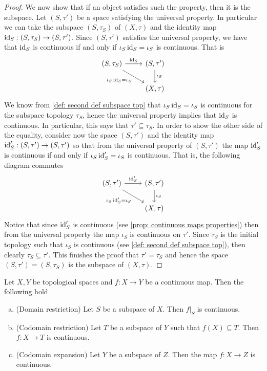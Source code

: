 \begin{proof}
    We now show that if an object satisfies such the property, then it is the
    subspace. Let \((S, \tau')\) be a space satisfying the universal
    property. In particular we can take the subspace \((S, \tau_S)\) of
    \((X, \tau)\) and the identity map \(\operatorname{id}_S: (S, \tau_S) \to (S,
    \tau')\). Since \((S, \tau')\) satisfies the universal property,
    we have that \(\operatorname{id}_S\) is continuous if and only if \(\iota_S  \operatorname{id}_S =
    \iota_S\) is continuous. That is
    \[
        \begin{tikzcd}
            (S, \tau_S)
            \ar[r, "\Id_S"]
            \ar[rd, swap, "\iota_S  \Id_S = \iota_S"]
            &(S, \tau') \ar[d, "\iota_S"] \\
            &(X, \tau)
        \end{tikzcd}
    \]
    We know from \cref{def: second def subspace top} that \(\iota_S  \operatorname{id}_S =
    \iota_S\) is continuous for the subspace topology \(\tau_S\), hence the
    universal property implies that \(\operatorname{id}_S\) is continuous. In particular, this
    says that \(\tau' \subseteq \tau_S\). In order to show the other
    side of the equality, consider now the space \((S, \tau')\) and the
    identity map \(\operatorname{id}_S': (S, \tau') \to (S, \tau')\) so that from the
    universal property of \((S, \tau')\) the map \(\operatorname{id}_S'\) is continuous if
    and only if \(\iota_S  \operatorname{id}_S' = \iota_S\) is continuous. That is, the
    following diagram commutes
    \[
        \begin{tikzcd}
            (S, \tau') \ar[r, "\Id_S'"]
            \ar[rd, swap, "\iota_S  \Id_S' = \iota_S"]
            &(S, \tau') \ar[d, "\iota_S"] \\
            &(X, \tau)
        \end{tikzcd}
    \]
    Notice that since \(\operatorname{id}_S'\) is continuous (see \cref{prop: continuous maps
        properties}) then from the universal property the map \(\iota_S\) is
    continuous on \(\tau'\). Since \(\tau_S\) is the initial topology
    such that \(\iota_S\) is continuous (see \cref{def: second def subspace top}),
    then clearly \(\tau_S \subseteq \tau'\). This finishes the proof
    that \(\tau' = \tau_S\) and hence the space \((S, \tau') =
    (S, \tau_S)\) is the subspace of \((X, \tau)\).
\end{proof}

\begin{corollary}\label{cor: subspace maps properties}
    Let \(X, Y\) be topological spaces and \(f: X \to Y\) be a continuous map.
    Then the following hold
    \begin{enumerate}[(a)]\setlength\itemsep{0em}
        \item (Domain restriction) Let \(S\) be a subspace of \(X\). Then \(f|_S\)
              is continuous.
        \item (Codomain restriction) Let \(T\) be a subspace of \(Y\) such that
              \(f(X) \subseteq T\). Then \(f: X \to T\) is continuous.
        \item (Codomain expansion) Let \(Y\) be a subspace of \(Z\). Then the map
              \(f : X \to Z\) is continuous.
    \end{enumerate}
\end{corollary}

